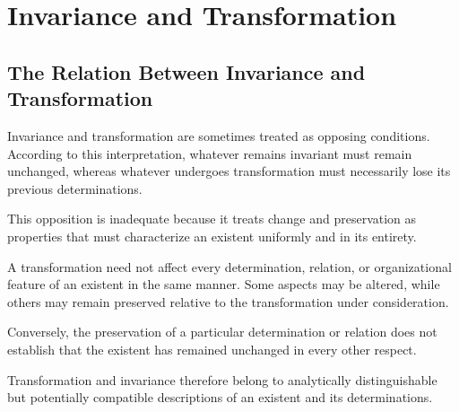 %
%
%
%
%

\section{Invariance and Transformation}
\label{sec:invariance-and-transformation}

\subsection{The Relation Between Invariance and Transformation}

Invariance and transformation are sometimes treated as
opposing conditions. According to this interpretation,
whatever remains invariant must remain unchanged, whereas
whatever undergoes transformation must necessarily lose
its previous determinations.

This opposition is inadequate because it treats change
and preservation as properties that must characterize
an existent uniformly and in its entirety.

A transformation need not affect every determination,
relation, or organizational feature of an existent in
the same manner. Some aspects may be altered, while others
may remain preserved relative to the transformation
under consideration.

Conversely, the preservation of a particular determination
or relation does not establish that the existent has
remained unchanged in every other respect.

Transformation and invariance therefore belong to
analytically distinguishable but potentially compatible
descriptions of an existent and its determinations.

